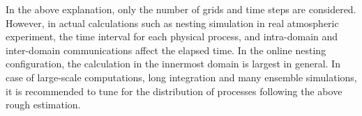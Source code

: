 In the above explanation, only the number of grids and time steps are considered. However, in actual calculations such as nesting simulation in real atmospheric experiment, the time interval for each physical process, and intra-domain and inter-domain communications affect the elapsed time. In the online nesting configuration, the calculation in the innermost domain is largest in general.  In case of large-scale computations, long integration and many ensemble simulations, it is recommended to tune for the distribution of processes following the above rough estimation.

